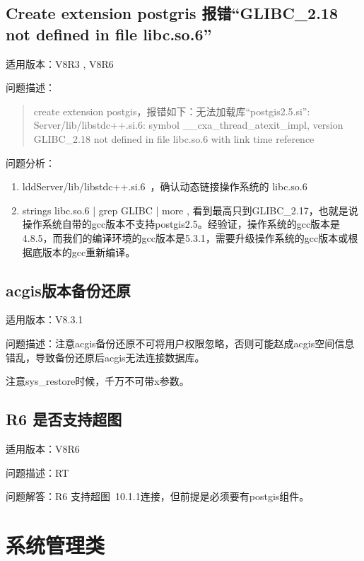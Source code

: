 \documentclass[letterpaper,10pt,english]{sphinxmanual}
\begin{document}
\section{Create extension postgris 报错“GLIBC\_2.18 not defined in file libc.so.6”}
\label{\detokenize{gis:create-extension-postgris-glibc-2-18-not-defined-in-file-libc-so-6}}
适用版本：V8R3 , V8R6

问题描述：
\begin{quote}

create extension postgis，报错如下：无法加载库“postgis\sphinxhyphen{}2.5.si”: Server/lib/libstdc++.si.6: symbol \_\_cxa\_thread\_atexit\_impl, version GLIBC\_2.18 not defined in file libc.so.6 with link time reference
\end{quote}

问题分析：
\begin{enumerate}
%
\item {} 
lddServer/lib/libstdc++.si.6 ，确认动态链接操作系统的 libc.so.6

\item {} 
strings libc.so.6 | grep GLIBC | more , 看到最高只到GLIBC\_2.17，也就是说操作系统自带的gcc版本不支持postgis\sphinxhyphen{}2.5。经验证，操作系统的gcc版本是4.8.5，而我们的编译环境的gcc版本是5.3.1，需要升级操作系统的gcc版本或根据底版本的gcc重新编译。

\end{enumerate}


\section{acgis版本备份还原}
\label{\detokenize{gis:acgis}}
适用版本：V8.3.1

问题描述：注意acgis备份还原不可将用户权限忽略，否则可能赵成acgis空间信息错乱，导致备份还原后acgis无法连接数据库。

注意sys\_restore时候，千万不可带\sphinxhyphen{}x参数。


\section{R6 是否支持超图}
\label{\detokenize{gis:r6}}
适用版本：V8R6

问题描述：RT

问题解答：R6 支持超图 10.1.1连接，但前提是必须要有postgis组件。


\chapter{系统管理类}
\label{\detokenize{system-management:id1}}\label{\detokenize{system-management::doc}}
\end{document}
